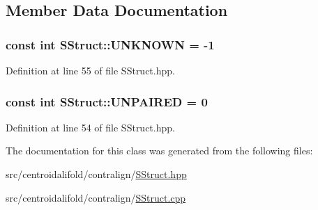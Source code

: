 \subsection{Member Data Documentation}
\hypertarget{class_c_o_n_t_r_a_l_i_g_n_1_1_s_struct_a5158068f84b0eea15da8d3f43572581a}{
\subsubsection[{U\+N\+K\+N\+O\+W\+N}]{\setlength{\rightskip}{0pt plus 5cm}const int S\+Struct\+::\+U\+N\+K\+N\+O\+W\+N = -\/1\hspace{0.3cm}{\ttfamily [static]}}}\label{class_c_o_n_t_r_a_l_i_g_n_1_1_s_struct_a5158068f84b0eea15da8d3f43572581a}


Definition at line 55 of file S\+Struct.\+hpp.

\hypertarget{class_c_o_n_t_r_a_l_i_g_n_1_1_s_struct_a65509ae93cf1bcb551d780653c721a56}{
\subsubsection[{U\+N\+P\+A\+I\+R\+E\+D}]{\setlength{\rightskip}{0pt plus 5cm}const int S\+Struct\+::\+U\+N\+P\+A\+I\+R\+E\+D = 0\hspace{0.3cm}{\ttfamily [static]}}}\label{class_c_o_n_t_r_a_l_i_g_n_1_1_s_struct_a65509ae93cf1bcb551d780653c721a56}


Definition at line 54 of file S\+Struct.\+hpp.



The documentation for this class was generated from the following files\+:\begin{DoxyCompactItemize}
\item 
src/centroidalifold/contralign/\hyperlink{centroidalifold_2contralign_2_s_struct_8hpp}{S\+Struct.\+hpp}\item 
src/centroidalifold/contralign/\hyperlink{centroidalifold_2contralign_2_s_struct_8cpp}{S\+Struct.\+cpp}\end{DoxyCompactItemize}
